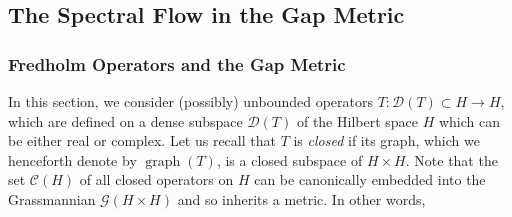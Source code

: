 \documentclass[a4paper,10pt]{article}
\DeclareMathOperator{\gra}{graph}
\begin{document}
\subsection{The Spectral Flow in the Gap Metric}


\subsubsection{Fredholm Operators and the Gap Metric}\label{section-gap}
In this section, we consider (possibly) unbounded operators $T:\mathcal{D}(T)\subset H\rightarrow H$, which are defined on a dense subspace $\mathcal{D}(T)$ of the Hilbert space $H$ which can be either real or complex. Let us recall that $T$ is \textit{closed} if its graph, which we henceforth denote by $\gra(T)$, is a closed subspace of $H\times H$. Note that the set $\mathcal{C}(H)$ of all closed operators on $H$ can be canonically embedded into the Grassmannian $\mathcal{G}(H\times H)$ and so inherits a metric. In other words, 
\end{document}
